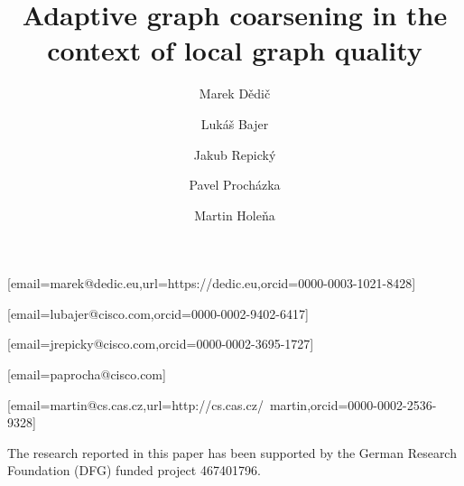 





\title{Adaptive graph coarsening in the context of local graph quality}
\author[1,2]{Marek Dědič}[email=marek@dedic.eu,url=https://dedic.eu,orcid=0000-0003-1021-8428]
\cormark[1]
\author[2]{Lukáš Bajer}[email=lubajer@cisco.com,orcid=0000-0002-9402-6417]
\author[2]{Jakub Repický}[email=jrepicky@cisco.com,orcid=0000-0002-3695-1727]
\author[2]{Pavel Procházka}[email=paprocha@cisco.com]
\author[3]{Martin Holeňa}[email=martin@cs.cas.cz,url=http://cs.cas.cz/~martin,orcid=0000-0002-2536-9328]

\address[1]{Czech Technical University in Prague, Břehová 7, Prague, Czech Republic}
\address[2]{Cisco Systems, Inc., Karlovo náměstı́ 10, Prague, Czech Republic}
\address[3]{Institute of Computer Science, Czech Academy of Sciences, Pod vodárenskou věží 2, Prague, Czech Republic}




\maketitle








\begin{acknowledgments}
  The research reported in this paper has been supported by the German Research Foundation (DFG) funded project 467401796.
\end{acknowledgments}




